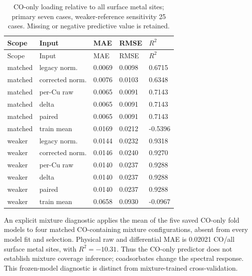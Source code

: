 \documentclass[11pt,a4paper]{article}
\begin{document}
\begingroup\footnotesize\setlength{\tabcolsep}{3pt}
\begin{longtable}{lllll}
\caption{CO-only loading relative to all surface metal sites; primary seven cases, weaker-reference sensitivity 25 cases. Missing or negative predictive value is retained.}\\
\toprule
Scope & Input & MAE & RMSE & $R^2$\\\midrule\endfirsthead
Scope & Input & MAE & RMSE & $R^2$\\\midrule\endhead
matched & legacy norm. & 0.0069 & 0.0098 & 0.6715\\
matched & corrected norm. & 0.0076 & 0.0103 & 0.6348\\
matched & per-Cu raw & 0.0065 & 0.0091 & 0.7143\\
matched & delta & 0.0065 & 0.0091 & 0.7143\\
matched & paired & 0.0065 & 0.0091 & 0.7143\\
matched & train mean & 0.0169 & 0.0212 & -0.5396\\
weaker & legacy norm. & 0.0144 & 0.0232 & 0.9318\\
weaker & corrected norm. & 0.0146 & 0.0240 & 0.9270\\
weaker & per-Cu raw & 0.0140 & 0.0237 & 0.9288\\
weaker & delta & 0.0140 & 0.0237 & 0.9288\\
weaker & paired & 0.0140 & 0.0237 & 0.9288\\
weaker & train mean & 0.0658 & 0.0930 & -0.0967\\
\bottomrule\end{longtable}\endgroup

An explicit mixture diagnostic applies the mean of the five saved CO-only fold models to four matched CO-containing mixture configurations, absent from every model fit and selection. Physical raw and differential MAE is 0.02021 CO/all surface metal sites, with $R^2=-10.31$. Thus the CO-only predictor does not establish mixture coverage inference; coadsorbates change the spectral response. This frozen-model diagnostic is distinct from mixture-trained cross-validation.
\end{document}
